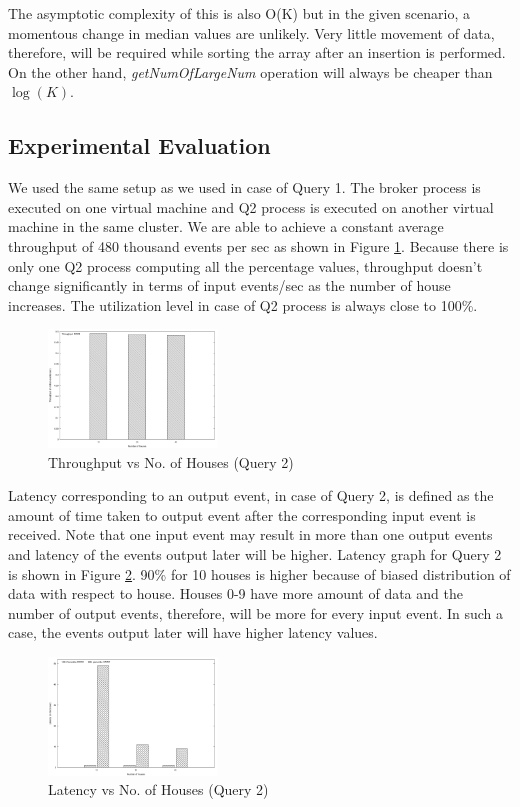 The asymptotic complexity of this is also O(K) but in the given scenario, a momentous change in median values are unlikely. Very little movement of data, therefore, will be required while sorting the array after an insertion is performed. On the other hand, \textit{getNumOfLargeNum} operation will always be cheaper than $\log(K)$.
 
\subsection{Experimental Evaluation}
We used the same setup as we used in case of Query 1. The broker process is executed on one virtual machine and Q2 process is executed on another virtual machine in the same cluster. We are able to achieve a constant average throughput of 480 thousand events per sec as shown in Figure \ref{fig:q2_throughput}. Because there is only one Q2 process computing all the percentage values, throughput doesn't change significantly in terms of input events/sec as the number of house increases. The utilization level in case of Q2 process is always close to 100\%.

\begin{figure}[h]
\begin{center}
	\includegraphics[width=0.4\textwidth]{img/q2_throughput}
	\vspace*{-0.4cm}
	\caption{Throughput vs No.
of Houses (Query 2) \label{fig:q2_throughput}}
\end{center}
\vspace*{-0.5cm}
\end{figure}

Latency corresponding to an output event, in case of Query 2, is defined as the amount of time taken to output event after the corresponding input event is received.
Note that one input event may result in more than one output events and latency of the events output later will be higher. Latency graph for Query 2 is shown in Figure \ref{fig:q2_latency}. 90\% for 10 houses is higher because of biased distribution of data with respect to house.
Houses 0-9 have more amount of data and the number of output events, therefore, will be more for every input event. In such a case, the events output later will have higher latency values.

\begin{figure}[h]
\begin{center}
	\includegraphics[width=0.4\textwidth]{img/q2_latency}
	\vspace*{-0.3cm}
	\caption{Latency vs No.
of Houses (Query 2) \label{fig:q2_latency}}
\end{center}
\vspace*{-0.5cm}
\end{figure}
